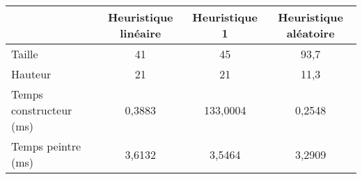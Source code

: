 \begin{center}
{\tabulinesep=1.2mm
\begin{tabu}{|l|c|c|c|}
  \hline
  & Heuristique linéaire  & Heuristique 1 & Heuristique aléatoire \\ 
  \hline
  Taille &        41&        45&      93,7  \\ 
  \hline
  Hauteur &        21&        21&      11,3  \\ 
  \hline
  Temps constructeur (ms) &          0,3883&        133,0004&          0,2548  \\ 
  \hline
  Temps peintre (ms) &            3,6132&           3,5464&           3,2909  \\ 
  \hline
\end{tabu}
}
\end{center}

